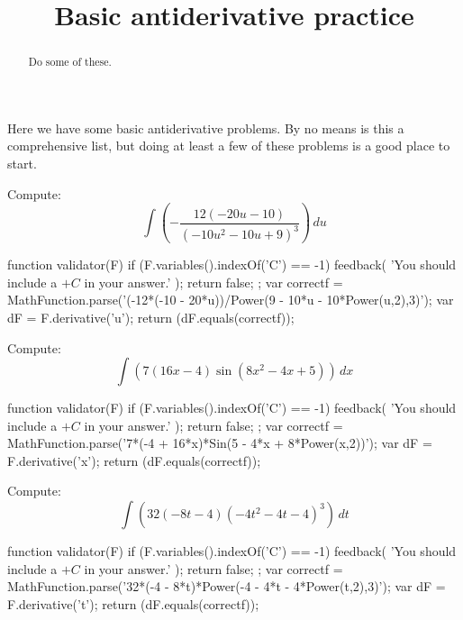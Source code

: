 \documentclass{ximera}
\title{Basic antiderivative practice}
\renewcommand{\d}{\, d}
\begin{document}
\begin{abstract}
Do some of these.
\end{abstract}
\maketitle

Here we have some basic antiderivative problems. By no means is this a
comprehensive list, but doing at least a few of these problems is a
good place to start.



\begin{exercise}
Compute: 
\[
\int \left(-\frac{12 (-20 u-10)}{\left(-10 u^2-10 u+9\right)^3}\right)\d u
\]
\begin{expressionAnswer}
     function validator(F) {
      if (F.variables().indexOf('C') == -1) {
        feedback( 'You should include a $+C$ in your answer.' );
        return false;
      };      
      var correctf = MathFunction.parse('(-12*(-10 - 20*u))/Power(9 - 10*u - 10*Power(u,2),3)');
      var dF = F.derivative('u');
      return (dF.equals(correctf));
    }
\end{expressionAnswer}
\end{exercise}



\begin{exercise}
Compute: 
\[
\int \left(7 (16 x-4) \sin \left(8 x^2-4 x+5\right)\right)\d x
\]
\begin{expressionAnswer}
     function validator(F) {
      if (F.variables().indexOf('C') == -1) {
        feedback( 'You should include a $+C$ in your answer.' );
        return false;
      };      
      var correctf = MathFunction.parse('7*(-4 + 16*x)*Sin(5 - 4*x + 8*Power(x,2))');
      var dF = F.derivative('x');
      return (dF.equals(correctf));
    }
\end{expressionAnswer}
\end{exercise}



\begin{exercise}
Compute: 
\[
\int \left(32 (-8 t-4) \left(-4 t^2-4 t-4\right)^3\right)\d t
\]
\begin{expressionAnswer}
     function validator(F) {
      if (F.variables().indexOf('C') == -1) {
        feedback( 'You should include a $+C$ in your answer.' );
        return false;
      };      
      var correctf = MathFunction.parse('32*(-4 - 8*t)*Power(-4 - 4*t - 4*Power(t,2),3)');
      var dF = F.derivative('t');
      return (dF.equals(correctf));
    }
\end{expressionAnswer}
\end{exercise}
\end{document}
